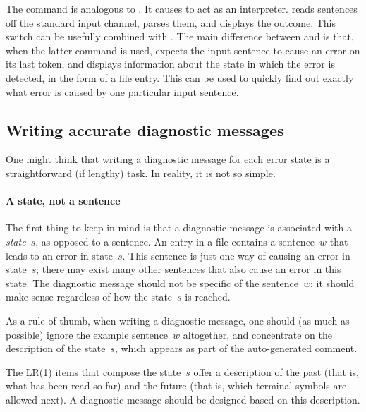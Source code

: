 \documentclass[onecolumn,11pt,nocopyrightspace,preprint]{sigplanconf}
\begin{document}
The command \ointerpreterror is analogous to \ointerpret. It causes \menhir to
act as an interpreter. \menhir reads sentences off the standard input channel,
parses them, and displays the outcome. This switch can be usefully combined
with \otrace. The main difference between \ointerpret and \ointerpreterror is
that, when the latter command is used,
\menhir expects the input sentence to cause an error on its last token, and
displays information about the state in which the error is detected, in the
form of a \messages file entry. This can be used to quickly find out exactly
what error is caused by one particular input sentence.


\subsection{Writing accurate diagnostic messages}
\label{sec:errors:diagnostics}

One might think that writing a diagnostic message for each error state is a
straightforward (if lengthy) task. In reality, it is not so simple.


\paragraph{A state, not a sentence}

The first thing to keep in mind is that a diagnostic message is associated
with a \emph{state}~$s$, as opposed to a sentence. An entry in a \messages
file contains a sentence~$w$ that leads to an error in state~$s$. This
sentence is just one way of causing an error in state~$s$; there may exist
many other sentences that also cause an error in this state. The diagnostic
message should not be specific of the sentence~$w$: it should make sense
regardless of how the state~$s$ is reached.

As a rule of thumb, when writing a diagnostic message, one should (as much as
possible) ignore the example sentence~$w$ altogether, and concentrate on the
description of the state~$s$, which appears as part of the auto-generated
comment.

The LR(1) items that compose the state~$s$ offer a description of the past
(that is, what has been read so far) and the future (that is, which terminal
symbols are allowed next). A diagnostic message should be designed based on
this description.
\end{document}
